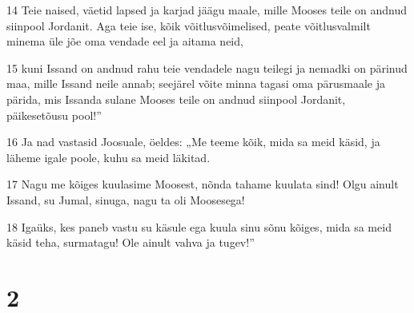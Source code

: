 \par 14 Teie naised, väetid lapsed ja karjad jäägu maale, mille Mooses teile on andnud siinpool Jordanit. Aga teie ise, kõik võitlusvõimelised, peate võitlusvalmilt minema üle jõe oma vendade eel ja aitama neid,
\par 15 kuni Issand on andnud rahu teie vendadele nagu teilegi ja nemadki on pärinud maa, mille Issand neile annab; seejärel võite minna tagasi oma pärusmaale ja pärida, mis Issanda sulane Mooses teile on andnud siinpool Jordanit, päikesetõusu pool!”
\par 16 Ja nad vastasid Joosuale, öeldes: „Me teeme kõik, mida sa meid käsid, ja läheme igale poole, kuhu sa meid läkitad.
\par 17 Nagu me kõiges kuulasime Moosest, nõnda tahame kuulata sind! Olgu ainult Issand, su Jumal, sinuga, nagu ta oli Moosesega!
\par 18 Igaüks, kes paneb vastu su käsule ega kuula sinu sõnu kõiges, mida sa meid käsid teha, surmatagu! Ole ainult vahva ja tugev!”

\chapter{2}

